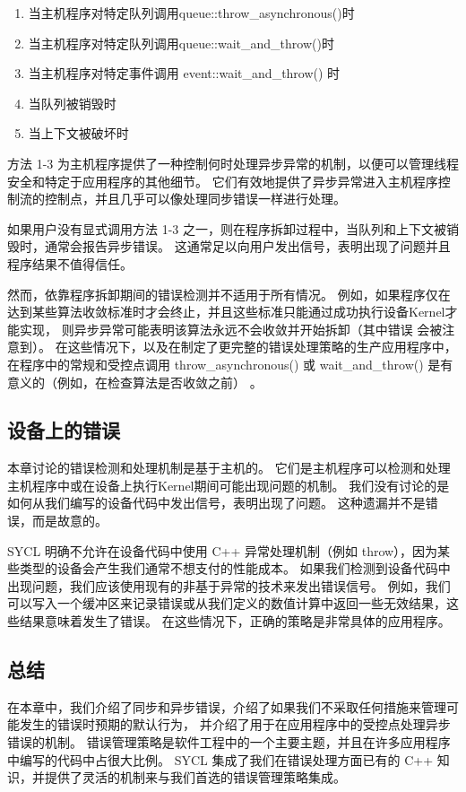 \begin{enumerate}
	\item 当主机程序对特定队列调用queue::throw\_asynchronous()时

	\item 当主机程序对特定队列调用queue::wait\_and\_throw()时

	\item 当主机程序对特定事件调用 event::wait\_and\_throw() 时

	\item 当队列被销毁时

	\item 当上下文被破坏时
\end{enumerate}

方法 1-3 为主机程序提供了一种控制何时处理异步异常的机制，以便可以管理线程安全和特定于应用程序的其他细节。 
它们有效地提供了异步异常进入主机程序控制流的控制点，并且几乎可以像处理同步错误一样进行处理。

如果用户没有显式调用方法 1-3 之一，则在程序拆卸过程中，当队列和上下文被销毁时，通常会报告异步错误。 
这通常足以向用户发出信号，表明出现了问题并且程序结果不值得信任。

然而，依靠程序拆卸期间的错误检测并不适用于所有情况。 
例如，如果程序仅在达到某些算法收敛标准时才会终止，并且这些标准只能通过成功执行设备Kernel才能实现，
则异步异常可能表明该算法永远不会收敛并开始拆卸（其中错误 会被注意到）。 
在这些情况下，以及在制定了更完整的错误处理策略的生产应用程序中，
在程序中的常规和受控点调用 throw\_asynchronous() 
或 wait\_and\_throw() 是有意义的（例如，在检查算法是否收敛之前） 。

\subsection{设备上的错误}
本章讨论的错误检测和处理机制是基于主机的。 
它们是主机程序可以检测和处理主机程序中或在设备上执行Kernel期间可能出现问题的机制。 
我们没有讨论的是如何从我们编写的设备代码中发出信号，表明出现了问题。 这种遗漏并不是错误，而是故意的。

SYCL 明确不允许在设备代码中使用 C++ 异常处理机制（例如 throw），因为某些类型的设备会产生我们通常不想支付的性能成本。 
如果我们检测到设备代码中出现问题，我们应该使用现有的非基于异常的技术来发出错误信号。 
例如，我们可以写入一个缓冲区来记录错误或从我们定义的数值计算中返回一些无效结果，这些结果意味着发生了错误。 
在这些情况下，正确的策略是非常具体的应用程序。

\subsection{总结}
在本章中，我们介绍了同步和异步错误，介绍了如果我们不采取任何措施来管理可能发生的错误时预期的默认行为，
并介绍了用于在应用程序中的受控点处理异步错误的机制。 
错误管理策略是软件工程中的一个主要主题，并且在许多应用程序中编写的代码中占很大比例。 
SYCL 集成了我们在错误处理方面已有的 C++ 知识，并提供了灵活的机制来与我们首选的错误管理策略集成。